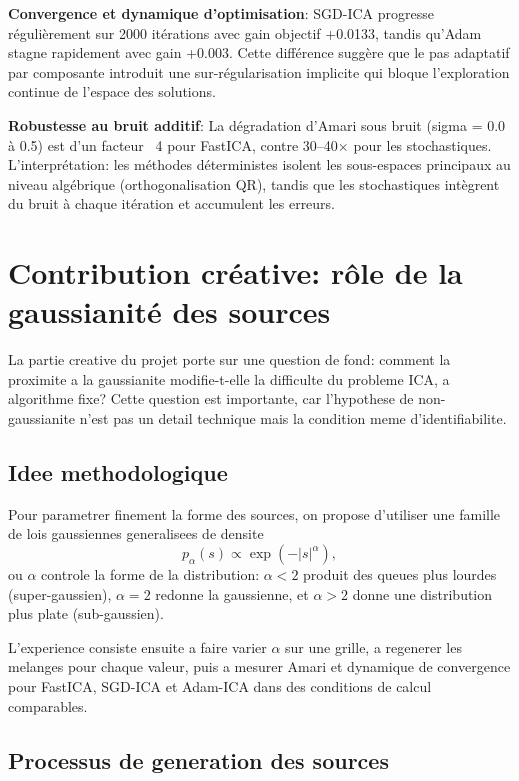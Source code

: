 \documentclass[11pt,a4paper]{article}
\begin{document}
\textbf{Convergence et dynamique d'optimisation}: SGD-ICA progresse régulièrement sur 2000 itérations avec gain objectif +0.0133, tandis qu'Adam stagne rapidement avec gain +0.003. Cette différence suggère que le pas adaptatif par composante introduit une sur-régularisation implicite qui bloque l'exploration continue de l'espace des solutions.

\textbf{Robustesse au bruit additif}: La dégradation d'Amari sous bruit (sigma = 0.0 à 0.5) est d'un facteur ~4 pour FastICA, contre 30--40× pour les stochastiques. L'interprétation: les méthodes déterministes isolent les sous-espaces principaux au niveau algébrique (orthogonalisation QR), tandis que les stochastiques intègrent du bruit à chaque itération et accumulent les erreurs.

\section{Contribution créative: rôle de la gaussianité des sources}

La partie creative du projet porte sur une question de fond: comment la proximite a la gaussianite modifie-t-elle la difficulte du probleme ICA, a algorithme fixe? Cette question est importante, car l'hypothese de non-gaussianite n'est pas un detail technique mais la condition meme d'identifiabilite.

\subsection{Idee methodologique}

Pour parametrer finement la forme des sources, on propose d'utiliser une famille de lois gaussiennes generalisees de densite
\begin{equation}
p_\alpha(s) \propto \exp\left(-|s|^\alpha\right),
\end{equation}
ou $\alpha$ controle la forme de la distribution: $\alpha<2$ produit des queues plus lourdes (super-gaussien), $\alpha=2$ redonne la gaussienne, et $\alpha>2$ donne une distribution plus plate (sub-gaussien).

L'experience consiste ensuite a faire varier $\alpha$ sur une grille, a regenerer les melanges pour chaque valeur, puis a mesurer Amari et dynamique de convergence pour FastICA, SGD-ICA et Adam-ICA dans des conditions de calcul comparables.

\subsection{Processus de generation des sources}
\end{document}
